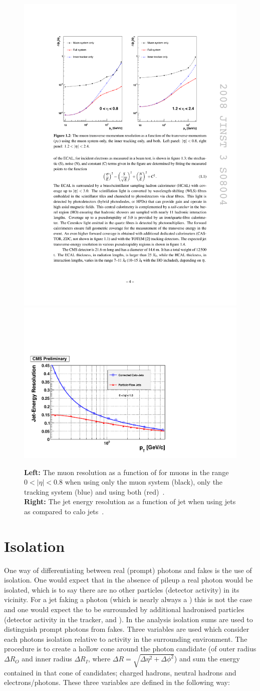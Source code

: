 \begin{figure}
  \includegraphics[height=0.4\textwidth]{ch2_cms_exp/plots/MuonResolution.pdf}
  \includegraphics[height=0.4\textwidth]{ch2_cms_exp/plots/BarrelResolutionPFAndCalo.pdf}
  \caption[Particle flow jet resolution]{\textbf{Left:} The muon \pT resolution as a function of \pT for muons in the range $0<|\eta|<0.8$ when using only the muon system (black), only the tracking system (blue) and using both (red)~\cite{CMS_JINST}. \\ \textbf{Right:} The jet energy resolution as a function of jet \pT when using \PF jets as compared to calo jets~\cite{cms_pf_performance}.}
  \label{fig:muon_jet_res}
\end{figure}

\section{Isolation}
\label{sec:iso}

One way of differentiating between real (prompt) photons and fakes is the use of isolation. One would expect that in the absence of pileup a real photon would be isolated, which is to say there are no other particles (detector activity) in its vicinity. For a jet faking a photon (which is nearly always a \pizero) this is not the case and one would expect the \pizero to be surrounded by additional hadronised particles (detector activity in the tracker, \ECAL and \HCAL). In the \CMS \Hgg analysis isolation sums are used to distinguish prompt photons from fakes. Three variables are used which consider each photons isolation relative to activity in the surrounding environment. The procedure is to create a hollow cone around the photon candidate (of outer radius $\Delta R_{O}$ and inner radius $\Delta R_{I}$, where $\Delta R = \sqrt{\Delta\eta^{2}+\Delta\phi^{2}}$) and sum the energy contained in that cone of \PF candidates; charged hadrons, neutral hadrons and electrons/photons. These three variables are defined in the following way:

